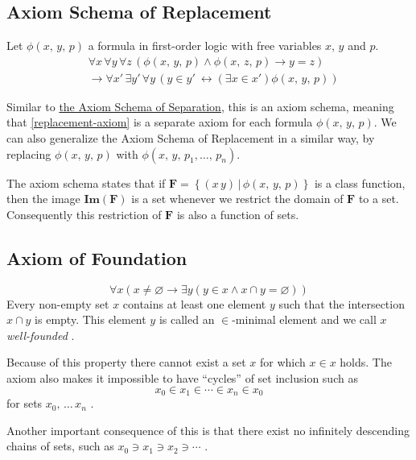 \documentclass[../../main.tex]{subfiles}
\begin{document}
\subsection{Axiom Schema of Replacement}\label{ZF8}
Let $\phi(x,\, y,\, p)$ a formula in first-order logic with free variables $x$, $y$ and $p$.
\begin{align}\label{replacement-axiom}
    &\forall x\, \forall y\, \forall z\, \left(\phi(x,\, y,\, p) \wedge \phi(x,\, z,\, p) \rightarrow y = z\right)\nonumber \\
    &\rightarrow \forall x'\, \exists y'\, \forall y\, \left(y \in y'\ \leftrightarrow \left(\exists x \in x'\right) \phi(x,\, y,\, p)\right)
\end{align}

Similar to \hyperref[ZF3]{the Axiom Schema of Separation}, this is an axiom schema, meaning that \eqref{replacement-axiom} is a separate axiom for each formula $\phi(x,\, y,\, p)$.
We can also generalize the Axiom Schema of Replacement in a similar way, by replacing $\phi(x,\, y,\, p)$ with $\phi(x,\, y,\, p_1,\ldots,\, p_n)$.

The axiom schema states that if $\mathbf{F} = \left\{(x\, y) \,\vert\, \phi(x,\, y,\, p)\right\}$ is a class function,
then the image $\mathbf{Im}(\mathbf{F})$ is a set whenever we restrict the domain of $\mathbf{F}$ to a set.
Consequently this restriction of $\mathbf{F}$ is also a function of sets. \cite[p.11]{Jec78}

\subsection{Axiom of Foundation}\label{ZF9}
$$\forall x \left(x \neq \varnothing \rightarrow \exists y \left(y \in x \wedge x \cap y = \varnothing \right)\right)$$
Every non-empty set $x$ contains at least one element $y$ such that the intersection $x \cap y$ is empty.
This element $y$ is called an $\in$-minimal element and we call $x$ \textit{well-founded} \cite[p.92]{Gol17}.

Because of this property there cannot exist a set $x$ for which $x \in x$ holds.
The axiom also makes it impossible to have ``cycles'' of set inclusion such as 
$$x_0 \in x_1 \in \cdots \in x_n \in x_0$$
for sets $x_0,\, \ldots\, x_n$ \cite[\S 1.9]{Jec78}.

Another important consequence of this is that there exist no infinitely descending chains of sets, such as $x_0 \ni x_1 \ni x_2 \ni \cdots$ \cite[Theorem 4.3, p.95]{Gol17}.
\end{document}

